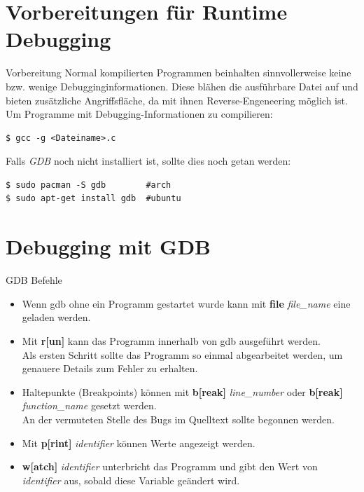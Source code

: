 \section{Vorbereitungen für Runtime Debugging}
\begin{frame}[fragile]{Vorbereitung}
	Normal kompilierten Programmen beinhalten sinnvollerweise keine bzw. wenige Debugginginformationen. Diese blähen die ausführbare Datei auf und bieten zusätzliche Angriffsfläche, da mit ihnen Reverse-Engeneering möglich ist.\\
	\bigskip
	Um Programme mit Debugging-Informationen zu compilieren:
		\begin{lstlisting}[numbers=none]
$ gcc -g <Dateiname>.c\end{lstlisting}
Falls \textit{GDB} noch nicht installiert ist, sollte dies noch getan werden:
		\begin{lstlisting}[numbers=none]
$ sudo pacman -S gdb        #arch
$ sudo apt-get install gdb  #ubuntu\end{lstlisting}

\end{frame}
\section{Debugging mit GDB}
\begin{frame}{GDB Befehle}
	\begin{itemize}
		\item Wenn gdb ohne ein Programm gestartet wurde kann mit \textbf{file}  \textit{file\_name} eine geladen werden.
		\item Mit \textbf{r[un]} kann das Programm innerhalb von gdb ausgeführt werden.\\
		Als ersten Schritt sollte das Programm so einmal abgearbeitet werden, um genauere Details zum Fehler zu erhalten.
		\item Haltepunkte (Breakpoints) können mit \textbf{b[reak]} \textit{line\_number} oder \textbf{b[reak]} \textit{function\_name} gesetzt werden.\\
		An der vermuteten Stelle des Bugs im Quelltext sollte begonnen werden.
		\item Mit \textbf{p[rint]} \textit{identifier} können Werte angezeigt werden.
		\item \textbf{w[atch]} \textit{identifier} unterbricht das Programm und gibt den Wert von \textit{identifier} aus, sobald diese Variable geändert wird.
	\end{itemize}
\end{frame}

